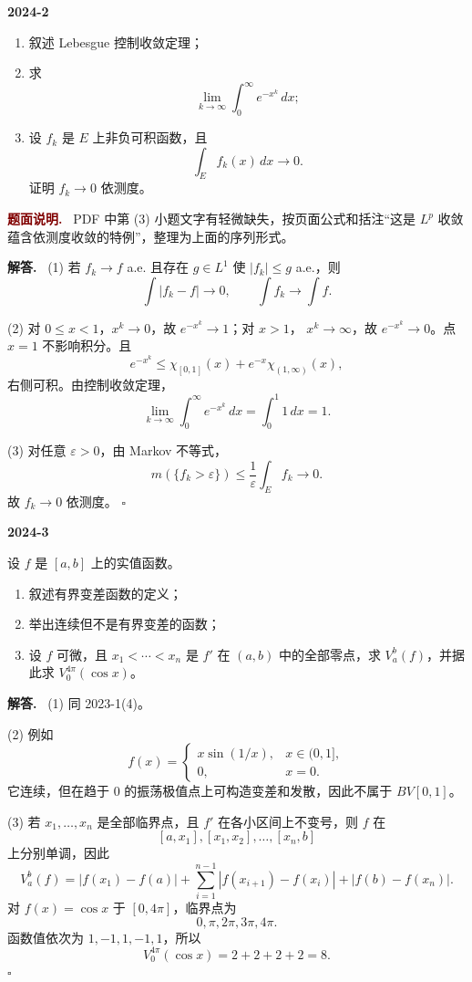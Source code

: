 \documentclass[UTF8]{ctexart}
\newcommand{\eps}{\varepsilon}
\newenvironment{problem}[1]{\par\medskip\noindent\textbf{#1}\par\smallskip}{\par}
\newenvironment{solution}{\par\noindent\textbf{解答.}\ }{\hfill$\square$\par\medskip}
\newenvironment{noteenv}{\par\noindent\textcolor{Maroon}{\textbf{题面说明.}}\ }{\par\smallskip}
\begin{document}
\begin{problem}{2024-2}
\begin{enumerate}[label=(\arabic*)]
  \item 叙述 Lebesgue 控制收敛定理；
  \item 求
  \[
    \lim_{k\to\infty}\int_0^\infty e^{-x^k}\,dx;
  \]
  \item 设 \(f_k\) 是 \(E\) 上非负可积函数，且
  \[
    \int_E f_k(x)\,dx\to0.
  \]
  证明 \(f_k\to0\) 依测度。
\end{enumerate}
\end{problem}
\begin{noteenv}
PDF 中第 (3) 小题文字有轻微缺失，按页面公式和括注“这是 \(L^p\) 收敛蕴含依测度收敛的特例”，整理为上面的序列形式。
\end{noteenv}
\begin{solution}
(1) 若 \(f_k\to f\) a.e. 且存在 \(g\in L^1\) 使 \(|f_k|\le g\) a.e.，则
\[
  \int |f_k-f|\to0,\qquad \int f_k\to\int f.
\]

(2) 对 \(0\le x<1\)，\(x^k\to0\)，故 \(e^{-x^k}\to1\)；对 \(x>1\)，
\(x^k\to\infty\)，故 \(e^{-x^k}\to0\)。点 \(x=1\) 不影响积分。且
\[
  e^{-x^k}\le \chi_{[0,1]}(x)+e^{-x}\chi_{(1,\infty)}(x),
\]
右侧可积。由控制收敛定理，
\[
  \lim_{k\to\infty}\int_0^\infty e^{-x^k}\,dx
  =\int_0^1 1\,dx=1.
\]

(3) 对任意 \(\eps>0\)，由 Markov 不等式，
\[
  m(\{f_k>\eps\})\le \frac1\eps\int_E f_k\to0.
\]
故 \(f_k\to0\) 依测度。
\end{solution}

\begin{problem}{2024-3}
设 \(f\) 是 \([a,b]\) 上的实值函数。
\begin{enumerate}[label=(\arabic*)]
  \item 叙述有界变差函数的定义；
  \item 举出连续但不是有界变差的函数；
  \item 设 \(f\) 可微，且 \(x_1<\cdots<x_n\) 是 \(f'\) 在 \((a,b)\) 中的全部零点，求
  \(V_a^b(f)\)，并据此求 \(V_0^{4\pi}(\cos x)\)。
\end{enumerate}
\end{problem}
\begin{solution}
(1) 同 2023-1(4)。

(2) 例如
\[
  f(x)=
  \begin{cases}
    x\sin(1/x),&x\in(0,1],\\
    0,&x=0.
  \end{cases}
\]
它连续，但在趋于 \(0\) 的振荡极值点上可构造变差和发散，因此不属于 \(BV[0,1]\)。

(3) 若 \(x_1,\dots,x_n\) 是全部临界点，且 \(f'\) 在各小区间上不变号，则 \(f\) 在
\[
  [a,x_1], [x_1,x_2],\dots,[x_n,b]
\]
上分别单调，因此
\[
  V_a^b(f)
  =|f(x_1)-f(a)|+\sum_{i=1}^{n-1}|f(x_{i+1})-f(x_i)|+|f(b)-f(x_n)|.
\]
对 \(f(x)=\cos x\) 于 \([0,4\pi]\)，临界点为
\[
  0,\pi,2\pi,3\pi,4\pi.
\]
函数值依次为 \(1,-1,1,-1,1\)，所以
\[
  V_0^{4\pi}(\cos x)=2+2+2+2=8.
\]
\end{solution}
\end{document}
